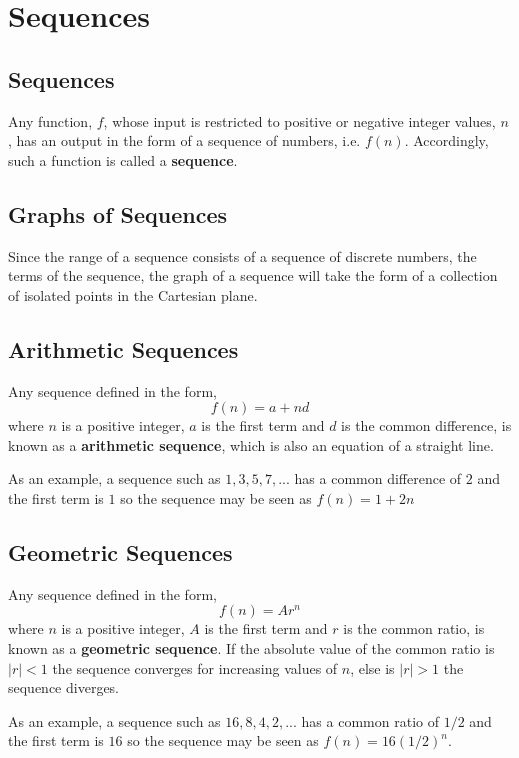 \section{Sequences}
    
    \subsection{Sequences}
        Any function, \(f\), whose input is restricted to positive or negative integer values, \(n\), has an output in
        the form of a sequence of numbers, i.e. \(f(n)\). Accordingly, such a function is called a \textbf{sequence}.

    \subsection{Graphs of Sequences}
        Since the range of a sequence consists of a sequence of discrete numbers, the terms of the sequence, the graph 
        of a sequence will take the form of a collection of isolated points in the Cartesian plane.

    \subsection{Arithmetic Sequences}
        Any sequence defined in the form,
        \begin{equation}
            f(n) = a + nd
        \end{equation}
        where \(n\) is a positive integer, \(a\) is the first term and \(d\) is the common difference, is known as a
        \textbf{arithmetic sequence}, which is also an equation of a straight line. 
        \par \hfill \break
        As an example, a sequence such as \(1, 3, 5, 7, ...\) has a common difference of \(2\) and the first term is
        \(1\) so the sequence may be seen as \(f(n) = 1 + 2n\)

    \subsection{Geometric Sequences}
        Any sequence defined in the form,
        \begin{equation}
            f(n) = Ar^n
        \end{equation}
        where \(n\) is a positive integer, \(A\) is the first term and \(r\) is the common ratio, is known as a
        \textbf{geometric sequence}. If the absolute value of the common ratio is \(|r|<1\) the sequence converges for
        increasing values of \(n\), else is \(|r|>1\) the sequence diverges.
        \par \hfill \break
        As an example, a sequence such as \(16, 8, 4, 2, ...\) has a common ratio of \(1/2\) and the first term is
        \(16\) so the sequence may be seen as \(f(n) = 16(1/2)^n\).

